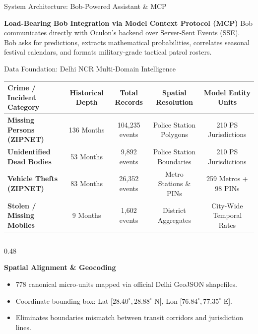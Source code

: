 \documentclass[aspectratio=169,10pt]{beamer}
\begin{document}
\begin{frame}{System Architecture: Bob-Powered Assistant \& MCP}
  \begin{exampleblock}{\textbf{Load-Bearing Bob Integration via Model Context Protocol (MCP)}}
    \small Bob communicates directly with Oculon's backend over Server-Sent Events (SSE). Bob asks for predictions, extracts mathematical probabilities, correlates seasonal festival calendars, and formats military-grade tactical patrol rosters.
  \end{exampleblock}
\end{frame}

\begin{frame}{Data Foundation: Delhi NCR Multi-Domain Intelligence}
  \begin{table}
    \centering
    \small
    \begin{tabular}{lcccc}
      \toprule
      \textbf{Crime / Incident Category} & \textbf{Historical Depth} & \textbf{Total Records} & \textbf{Spatial Resolution} & \textbf{Model Entity Units} \\
      \midrule
      \rowcolor{CardBg} \textbf{Missing Persons (ZIPNET)} & 136 Months & 104,235 events & Police Station Polygons & 210 PS Jurisdictions \\
      \textbf{Unidentified Dead Bodies} & 53 Months & 9,892 events & Police Station Boundaries & 210 PS Jurisdictions \\
      \rowcolor{CardBg} \textbf{Vehicle Thefts (ZIPNET)} & 83 Months & 26,352 events & Metro Stations \& PINs & 259 Metros + 98 PINs \\
      \textbf{Stolen / Missing Mobiles} & 9 Months & 1,602 events & District Aggregates & City-Wide Temporal Rates \\
      \bottomrule
    \end{tabular}
  \end{table}

  \begin{columns}[T]
    \begin{column}{0.48\textwidth}
      \begin{block}{\textbf{Spatial Alignment \& Geocoding}}
        \footnotesize
        \begin{itemize}\itemsep=0.2em
          \item 778 canonical micro-units mapped via official Delhi GeoJSON shapefiles.
          \item Coordinate bounding box: Lat [$28.40^\circ, 28.88^\circ$ N], Lon [$76.84^\circ, 77.35^\circ$ E].
          \item Eliminates boundaries mismatch between transit corridors and jurisdiction lines.
        \end{itemize}
      \end{block}
    \end{column}


\end{columns}
\end{frame}
\end{document}

